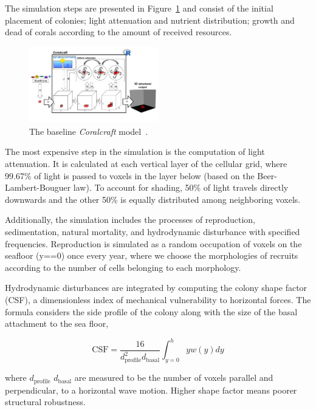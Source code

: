 \documentclass[9pt]{pnas-new}
\begin{document}
The simulation steps are presented in Figure~\ref{fig:base_model} and consist of the initial placement of colonies; light attenuation and nutrient distribution; growth and dead of corals according to the amount of received resources.

\begin{figure}[H]
    \centering
    \includegraphics[width=0.5\textwidth]{fig/model.png}
    \caption{The baseline \textit{Coralcraft} model~\cite{coral_community_3D}.}
    \label{fig:base_model}
\end{figure}

The most expensive step in the simulation is the computation of light attenuation. It is calculated at each vertical layer of the cellular grid, where 99.67\% of light is passed to voxels in the layer below (based on the Beer-Lambert-Bouguer law). To account for shading, 50\% of light travels directly downwards and the other 50\% is equally distributed among neighboring voxels.

Additionally, the simulation includes the processes of reproduction, sedimentation, natural mortality, and hydrodynamic disturbance with specified frequencies. Reproduction is simulated as a random occupation of voxels on the seafloor (y==0) once every year, where we choose the morphologies of recruits according to the number of cells belonging to each morphology.

Hydrodynamic disturbances are integrated by computing the colony shape factor (CSF), a dimensionless index of mechanical vulnerability to horizontal forces. The formula considers the side profile of the colony along with the size of the basal attachment to the sea floor,

\begin{equation*}
    \text{CSF} = \frac{16}{d_{\text{profile}}^2d_{\text{basal}}} \int_{y=0}^h y w(y) dy
\end{equation*}

where $d_{\text{profile}}$ $d_{\text{basal}}$ are measured to be the number of voxels parallel and perpendicular, to a horizontal wave motion. Higher shape factor means poorer structural robustness.
\end{document}
